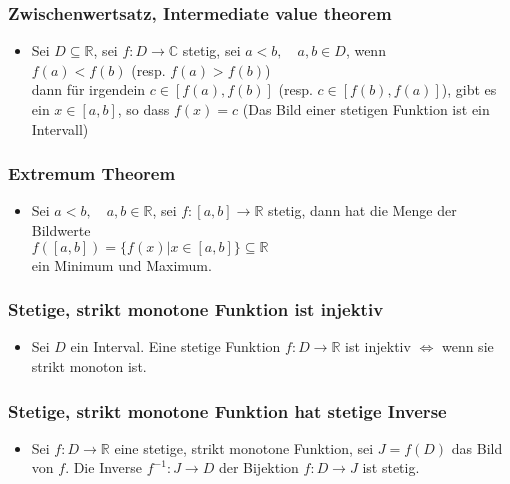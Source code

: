 \documentclass[a3paper, 11pt, landscape]{scrartcl}
\begin{document}
\begin{multicols*}{3}
	\subsubsection{Zwischenwertsatz, Intermediate value theorem}
	\begin{itemize}
	    \item Sei $D \subseteq \mathbb{R}$, sei $f:D\to \mathbb{C}$ stetig, sei $a<b, \quad a,b \in D$, wenn \\
	    $f(a)<f(b)$ (resp. $f(a)>f(b)$) \\
	    dann für irgendein $c\in [f(a),f(b)]$ (resp. $c\in[f(b),f(a)]$), gibt es ein $x\in [a,b]$, so dass $f(x)=c$ (Das Bild einer stetigen Funktion ist ein Intervall)
	\end{itemize}
	
	\subsubsection{Extremum Theorem}
	\begin{itemize}
	    \item Sei $a<b, \quad a,b\in \mathbb{R}$, sei $f:[a,b]\to \mathbb{R}$ stetig, dann hat die Menge der Bildwerte \\
	    $f([a,b])=\{f(x) | x \in [a,b]\}\subseteq \mathbb{R}$
	    \\ ein Minimum und Maximum.
	\end{itemize}
	
	\subsubsection{Stetige, strikt monotone Funktion ist injektiv}
	\begin{itemize}
	    \item Sei $D$ ein Interval. Eine stetige Funktion $f:D\to\mathbb{R}$ ist injektiv $\iff$ wenn sie strikt monoton ist.
	\end{itemize}
	
	\subsubsection{Stetige, strikt monotone Funktion hat stetige Inverse}
	\begin{itemize}
	    \item Sei $f:D\to\mathbb{R}$ eine stetige, strikt monotone Funktion, sei $J = f(D)$ das Bild von $f$. Die Inverse $f^{-1}:J\to D$ der Bijektion $f:D\to J$ ist stetig.
	\end{itemize}
	

\end{multicols*}
\end{document}
